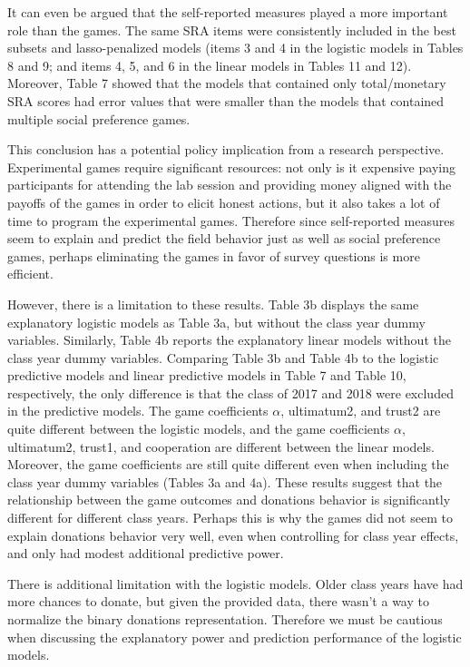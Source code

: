 \documentclass[12pt]{article}
\begin{document}
It can even be argued that the self-reported measures played a more important role than the games. The same SRA items were consistently included in the best subsets and lasso-penalized models (items 3 and 4 in the logistic models in Tables 8 and 9; and items 4, 5, and 6 in the linear models in Tables 11 and 12). Moreover, Table 7 showed that the models that contained only total/monetary SRA scores had error values that were smaller than the models that contained multiple social preference games.

This conclusion has a potential policy implication from a research perspective. Experimental games require significant resources: not only is it expensive paying participants for attending the lab session and providing money aligned with the payoffs of the games in order to elicit honest actions, but it also takes a lot of time to program the experimental games. Therefore since self-reported measures seem to explain and predict the field behavior just as well as social preference games, perhaps eliminating the games in favor of survey questions is more efficient.

However, there is a limitation to these results. Table 3b displays the same explanatory logistic models as Table 3a, but without the class year dummy variables. Similarly, Table 4b reports the explanatory linear models without the class year dummy variables. Comparing Table 3b and Table 4b to the logistic predictive models and linear predictive models in Table 7 and Table 10, respectively, the only difference is that the class of 2017 and 2018 were excluded in the predictive models. The game coefficients \(\alpha\), ultimatum2, and trust2 are quite different between the logistic models, and the game coefficients \(\alpha\), ultimatum2, trust1, and cooperation are different between the linear models. Moreover, the game coefficients are still quite different even when including the class year dummy variables (Tables 3a and 4a). These results suggest that the relationship between the game outcomes and donations behavior is significantly different for different class years. Perhaps this is why the games did not seem to explain donations behavior very well, even when controlling for class year effects, and only had modest additional predictive power.

There is additional limitation with the logistic models. Older class years have had more chances to donate, but given the provided data, there wasn\rq t a way to normalize the binary donations representation. Therefore we must be cautious when discussing the explanatory power and prediction performance of the logistic models.
\end{document}
